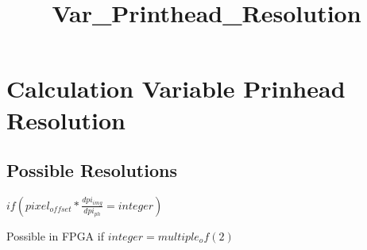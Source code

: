 \documentclass{article}
\title{Var\_Printhead\_Resolution}
\begin{document}
    
    
    \maketitle
    
    

    
    \section{Calculation Variable Prinhead
Resolution}\label{calculation-variable-prinhead-resolution}

    \subsection{Possible Resolutions}\label{possible-resolutions}

    \(if(pixel_{offset} * \frac{dpi_{img}}{dpi_{ph}} = integer)\)

Possible in FPGA if \(integer = multiple_of(2)\)
\end{document}
